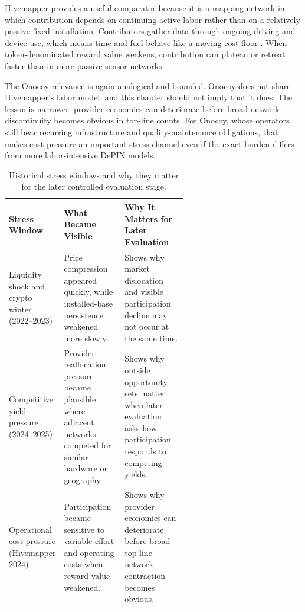 Hivemapper provides a useful comparator because it is a mapping network in which contribution depends on continuing active labor rather than on a relatively passive fixed installation. Contributors gather data through ongoing driving and device use, which means time and fuel behave like a moving cost floor \cite{Chiu2024, FrontiersDePIN2025}. When token-denominated reward value weakens, contribution can plateau or retreat faster than in more passive sensor networks.

The Onocoy relevance is again analogical and bounded. Onocoy does not share Hivemapper's labor model, and this chapter should not imply that it does. The lesson is narrower: provider economics can deteriorate before broad network discontinuity becomes obvious in top-line counts. For Onocoy, whose operators still bear recurring infrastructure and quality-maintenance obligations, that makes cost pressure an important stress channel even if the exact burden differs from more labor-intensive DePIN models.

\begin{table}[H]
    \centering
    \small
    \renewcommand{\arraystretch}{1.2}
    \begin{tabularx}{\textwidth}{@{}>{\raggedright\arraybackslash}p{0.26\linewidth}>{\raggedright\arraybackslash}p{0.34\linewidth}X@{}}
        \toprule
        \textbf{Stress Window} & \textbf{What Became Visible} & \textbf{Why It Matters for Later Evaluation} \\
        \midrule
        Liquidity shock and crypto winter (2022--2023) & Price compression appeared quickly, while installed-base persistence weakened more slowly. & Shows why market dislocation and visible participation decline may not occur at the same time. \\
        Competitive yield pressure (2024--2025) & Provider reallocation pressure became plausible where adjacent networks competed for similar hardware or geography. & Shows why outside opportunity sets matter when later evaluation asks how participation responds to competing yields. \\
        Operational cost pressure (Hivemapper 2024) & Participation became sensitive to variable effort and operating costs when reward value weakened. & Shows why provider economics can deteriorate before broad top-line network contraction becomes obvious. \\
        \bottomrule
    \end{tabularx}
    \caption[Historical stress windows]{Historical stress windows and why they matter for the later controlled evaluation stage.}
    \label{tab:empirical_stress_windows_summary}
\end{table}

